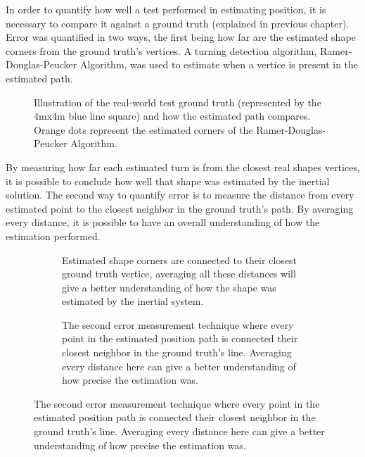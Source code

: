 In order to quantify how well a test performed in estimating position, it is necessary to compare it against a ground truth (explained in previous chapter). Error was quantified in two ways, the first being how far are the estimated shape corners from the ground truth's vertices. A turning detection algorithm, Ramer-Douglas-Peucker Algorithm, was used to estimate when a vertice is present in the estimated path.

\begin{figure}[!h]
  \centering
  \resizebox{0.8\linewidth}{!}{}
  \caption{Illustration of the real-world test ground truth (represented by the 4mx4m  blue line square) and how the estimated path compares. Orange dots represent the estimated corners of the Ramer-Douglas-Peucker Algorithm. }
  \label{fig:square_truth}
\end{figure}

By measuring how far each estimated turn is from the closest real shapes vertices, it is possible to conclude how well that shape was estimated by the inertial solution.
The second way to quantify error is to measure the distance from every estimated point to the closest neighbor in the ground truth's path. By averaging every distance, it is possible to have an overall understanding of how the estimation performed.

\begin{figure}[!h]
  \centering
  \begin{subfigure}{0.75\textwidth}
    \centering
    \resizebox{1\linewidth}{!}{}
    \caption{Estimated shape corners are connected to their closest ground truth vertice, averaging all these distances will give a better understanding of how the shape was estimated by the inertial system.}
    \label{fig:square_turn}
  \end{subfigure}

  \begin{subfigure}{0.75\textwidth}
    \centering
    \resizebox{1\linewidth}{!}{}
    \caption{The second error measurement technique where every point in the estimated position path is connected their closest neighbor in the ground truth's line. Averaging every distance here can give a better understanding of how precise the estimation was.}
    \label{fig:square_point}
  \end{subfigure}
  \label{fig:error_methods}
\end{figure}


